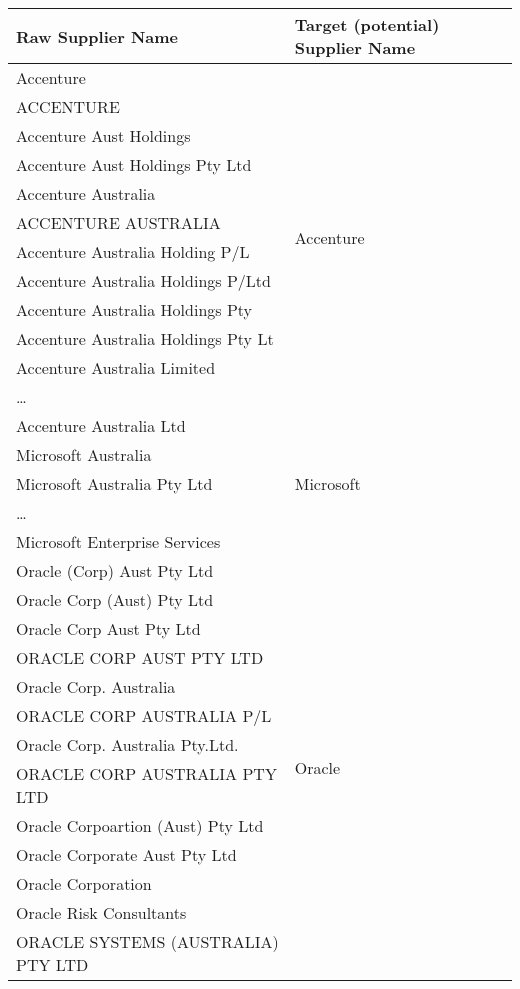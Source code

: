 \documentclass{llncs}
\begin{document}
\begin{table}[!htb]
\renewcommand{\arraystretch}{1.3}
\begin{center}
\begin{tabular}{|l|l|}
\hline
  \textbf{Raw Supplier Name} & \textbf{Target (potential) Supplier Name}\\  \hline
  Accenture & \multirow{12}{*}{Accenture} \\
  ACCENTURE & \\ 
  Accenture Aust Holdings & \\  
  Accenture Aust Holdings Pty Ltd & \\
  Accenture Australia & \\
  ACCENTURE AUSTRALIA & \\
  Accenture  Australia Holding P/L & \\
  Accenture Australia Holdings P/Ltd & \\
  Accenture Australia Holdings Pty & \\
  Accenture Australia Holdings Pty Lt  & \\  
  Accenture Australia Limited & \\
  \ldots  & \\
  Accenture Australia Ltd & \\ \hline
  Microsoft Australia &  \multirow{3}{*}{Microsoft} \\
  Microsoft Australia Pty Ltd & \\
  \ldots  & \\
  Microsoft Enterprise Services & \\ \hline
  Oracle (Corp) Aust Pty Ltd  & \multirow{14}{*}{Oracle} \\
  Oracle Corp (Aust) Pty Ltd  & \\
  Oracle Corp Aust Pty Ltd & \\
  ORACLE CORP AUST PTY LTD & \\
  Oracle Corp. Australia & \\
  ORACLE CORP AUSTRALIA P/L & \\
  Oracle Corp. Australia Pty.Ltd. & \\
  ORACLE CORP AUSTRALIA PTY LTD & \\
  Oracle Corpoartion (Aust) Pty Ltd & \\
  Oracle Corporate Aust Pty Ltd & \\
  Oracle Corporation & \\
  Oracle Risk Consultants & \\
  ORACLE SYSTEMS (AUSTRALIA) PTY LTD & \\

\end{tabular}
\end{center}
\end{table}
\end{document}
